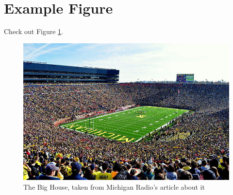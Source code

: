 \blindtext


\section{Example Figure}
\label{sec:examplesec3}

Check out Figure \ref{fig:the_big_house}. \blindtext

\begin{figure}
    \centering
    \includegraphics{chapters/figures/the_big_house.jpeg}
    \caption{The Big House, taken from Michigan Radio's article about it \cite{the_big_house}}
    \label{fig:the_big_house}
\end{figure}

\blindtext[3]